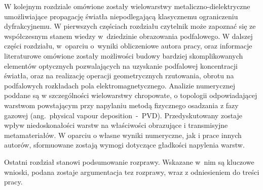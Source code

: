 W kolejnym rozdziale omówione zostały wielowarstwy metaliczno-dielektryczne umożliwiające propagację światła niepodlegającą klasycznemu ograniczeniu dyfrakcyjnemu. W pierwszych częściach rozdziału czytelnik może zapoznać się ze współczesnym stanem wiedzy w~dziedzinie obrazowania podfalowego. W dalszej części rozdziału, w~oparciu o~wyniki obliczeniowe autora pracy, oraz informacje literaturowe omówione zostały możliwości budowy bardziej skomplikowanych elementów optycznych pozwalających na uzyskanie podfalowej koncentracji światła, oraz na realizację operacji geometrycznych rzutowania, obrotu na podfalowych rozkładach pola elektromagnetycznego. Analizie numerycznej poddane są w szczególności wielowarstwy chropowate, o topologii odpowiadającej warstwom powstającym przy napylaniu metodą fizycznego osadzania z fazy gazowej (ang.~physical vapour deposition~-~PVD). Przedyskutowany zostaje wpływ niedoskonałości warstw na właściwości obrazujące i transmisyjne metamateriałów. W oparciu o własne wyniki numeryczne, jak i prace innych autorów, sformuowane zostają wymogi dotyczące gładkości napylenia warstw.

Ostatni rozdział stanowi podsumowanie rozprawy. Wskazane w~nim są kluczowe wnioski, podana zostaje argumentacja tez rozprawy, wraz z odniesieniem do treści pracy.
